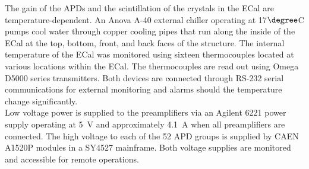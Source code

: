 The gain of the APDs and the scintillation of the crystals in the ECal are temperature-dependent. An Anova A-40 external chiller operating at 17$\degree$C pumps cool water through copper cooling pipes that run along the inside of the ECal at the top, bottom, front, and back faces of the structure. The internal temperature of the ECal was monitored using sixteen thermocouples located at various locations within the ECal. The thermocouples are read out using Omega D5000 series transmitters. Both devices are connected through RS-232 serial communications for external monitoring and alarms should the temperature change significantly.\\
\indent Low voltage power is supplied to the preamplifiers via an Agilent 6221 power supply operating at 5~V and approximately 4.1~A when all preamplifiers are connected. The high voltage to each of the 52 APD groups is supplied by CAEN A1520P modules in a SY4527 mainframe. Both voltage supplies are monitored and accessible for remote operations.  

